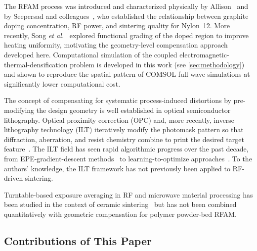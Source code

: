 \documentclass[5p,times]{elsarticle}
\begin{document}
The RFAM process was introduced and characterized physically by
Allison~\cite{allisonDissertation} and by Seepersad and
colleagues~\cite{allison2022volumetric,allison2022computational}, who
established the relationship between graphite doping concentration,
RF power, and sintering quality for Nylon~12.  More recently, Song
\textit{et al.}~\cite{Song2025RFAMUniformity} explored functional
grading of the doped region to improve heating uniformity, motivating
the geometry-level compensation approach developed here.  Computational
simulation of the coupled electromagnetic-thermal-densification
problem is developed in this work (see \cref{sec:methodology}) and shown to
reproduce the spatial pattern of COMSOL full-wave simulations at
significantly lower computational cost.

The concept of compensating for systematic process-induced distortions
by pre-modifying the design geometry is well established in optical
semiconductor lithography.  Optical proximity correction (OPC) and,
more recently, inverse lithography technology (ILT) iteratively modify
the photomask pattern so that diffraction, aberration, and resist
chemistry combine to print the desired target
feature~\cite{pang2021inverse,poonawala2007mask,chan2008initialization}.
The ILT field has seen rapid algorithmic progress over the past decade,
from EPE-gradient-descent methods~\cite{zhang2023fast} to
learning-to-optimize approaches~\cite{zhu2024l2o}.  To the authors'
knowledge, the ILT framework has not previously been applied to
RF-driven sintering.

Turntable-based exposure averaging in RF and microwave material
processing has been studied in the context of ceramic
sintering~\cite{RFceramic2023,ferdous2017rfheating} but has not been
combined quantitatively with geometric compensation for polymer
powder-bed RFAM.

\subsection{Contributions of This Paper}
\end{document}
